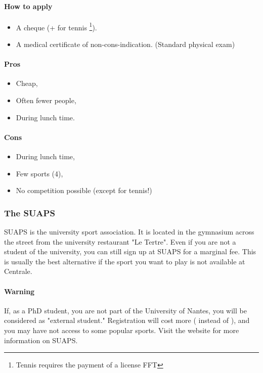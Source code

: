 \paragraph{How to apply}
\begin{itemize}
  \item A cheque  (+  for tennis \footnote {Tennis requires the payment of a license FFT}).
  \item A medical certificate of non-cons-indication. (Standard physical exam)
\end{itemize}

\paragraph{Pros}
\begin{itemize}
  \item Cheap,
  \item Often fewer people,
  \item During lunch time.
\end{itemize}
\paragraph{Cons}
\begin{itemize}
  \item During lunch time,
  \item Few sports (4),
  \item No competition possible (except for tennis!)
\end{itemize}

\subsubsection {The SUAPS}
SUAPS is the university sport association. It is located in the gymnasium across the street from the university restaurant "Le Tertre".
Even if you are not a student of the university, you can still sign up at SUAPS for a marginal fee.
This is usually the best alternative if the sport you want to play is not available at Centrale.

\paragraph{Warning} If, as a PhD student, you are not part of the University of Nantes, you will be considered as "external student."
Registration will cost more ( instead of ), and you may have not access to some popular sports.
Visit the website for more information on SUAPS.

